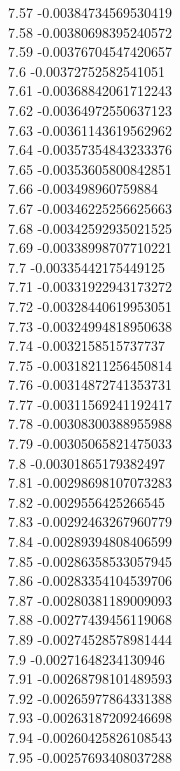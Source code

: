 {7.57	-0.00384734569530419\\
7.58	-0.00380698395240572\\
7.59	-0.00376704547420657\\
7.6	-0.00372752582541051\\
7.61	-0.00368842061712243\\
7.62	-0.00364972550637123\\
7.63	-0.00361143619562962\\
7.64	-0.00357354843233376\\
7.65	-0.00353605800842851\\
7.66	-0.003498960759884\\
7.67	-0.00346225256625663\\
7.68	-0.00342592935021525\\
7.69	-0.00338998707710221\\
7.7	-0.00335442175449125\\
7.71	-0.00331922943173272\\
7.72	-0.00328440619953051\\
7.73	-0.00324994818950638\\
7.74	-0.0032158515737737\\
7.75	-0.00318211256450814\\
7.76	-0.00314872741353731\\
7.77	-0.00311569241192417\\
7.78	-0.00308300388955988\\
7.79	-0.00305065821475033\\
7.8	-0.00301865179382497\\
7.81	-0.00298698107073283\\
7.82	-0.0029556425266545\\
7.83	-0.00292463267960779\\
7.84	-0.00289394808406599\\
7.85	-0.00286358533057945\\
7.86	-0.00283354104539706\\
7.87	-0.00280381189009093\\
7.88	-0.00277439456119068\\
7.89	-0.00274528578981444\\
7.9	-0.00271648234130946\\
7.91	-0.00268798101489593\\
7.92	-0.00265977864331388\\
7.93	-0.00263187209246698\\
7.94	-0.00260425826108543\\
7.95	-0.00257693408037288\\
}
